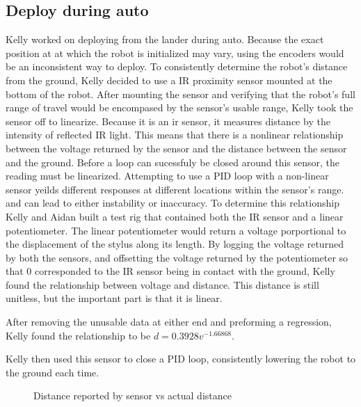 \documentclass{article}
\begin{document}
\subsection{Deploy during auto}
Kelly worked on deploying from the lander during auto. Because the exact position at at which the robot is initialized may vary, using the encoders would be an inconsistent way to deploy. To consistently determine the robot's distance from the ground, Kelly decided to use a IR proximity sensor mounted at the bottom of the robot. After mounting the sensor and verifying that the robot's full range of travel would be encompased by the sensor's usable range, Kelly took the sensor off to linearize. Because it is an ir sensor, it measures distance by the intensity of reflected IR light. This means that there is a nonlinear relationship between the voltage returned by the sensor and the distance between the sensor and the ground. Before a loop can sucessfuly be closed around this sensor, the reading must be linearized. Attempting to use a PID loop with a non-linear sensor yeilds different responses at different locations within the sensor's range. and can lead to either instability or inaccuracy. To determine this relationship Kelly and Aidan built a test rig that contained both the IR sensor and a linear potentiometer. The linear potentiometer would return a voltage porportional to the displacement of the stylus along its length. By logging the voltage returned by both the sensors, and offsetting the voltage returned by the potentiometer so that 0 corresponded to the IR sensor being in contact with the ground, Kelly found the relationship between voltage and distance. This distance is still unitless, but the important part is that it is linear.

After removing the unusable data at either end and preforming a regression, Kelly found the relationship to be $d=0.3928 v^{-1.66868}$. 

Kelly then used this sensor to close a PID loop, consistently lowering the robot to the ground each time.


\begin {figure}
\centering
{}
\caption {Distance reported by sensor vs actual distance}
\label {fig:graph}
\end{figure}
\end{document}
